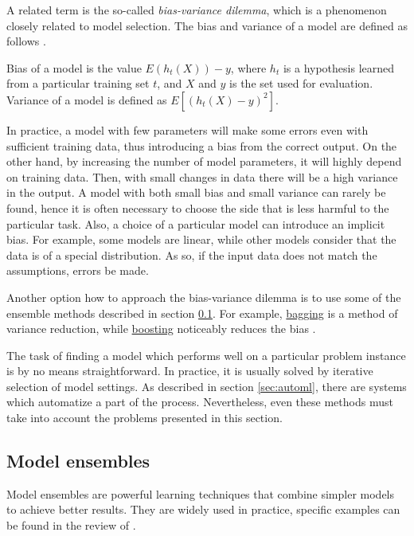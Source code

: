 A related term is the so-called \emph{bias-variance dilemma}, which is a phenomenon
closely related to model selection. The bias and variance of a model are
defined as follows \citep[p.59,~356]{CaseBerg:01}.

\begin{definition}
Bias of a model is the value $E(h_t(X)) - y$, where $h_t$ is a
hypothesis learned from a particular training set $t$, and $X$ and $y$ is the
set used for evaluation. Variance of a model is defined as $E[(h_t(X) - y)^2]$.
\end{definition}

In practice, a model with few parameters will make some errors even with
sufficient training data, thus introducing a bias from the correct output.
On the other hand, by  increasing the number of model parameters, it will
highly depend on training data. Then, with small changes in data there will be
a high variance in the output. A model with both small bias and small variance
can rarely be found, hence it is often necessary to choose the side that is
less harmful to the particular task. Also, a choice of a particular model can
introduce an implicit bias. For example, some models are linear, while other models
consider that the data is of a special distribution. As so, if the input data does
not match the assumptions, errors be made.

Another option how to approach the bias-variance dilemma
is to use some of the ensemble methods described in section \ref{ensemble}. For
example, \hyperref[bagging]{bagging} is a method of variance reduction, while
\hyperref[boosting]{boosting} noticeably reduces the bias
\citep[p.~93--94,~338]{Flach:2012:MLA:2490546}.

The task of finding a model which performs well on a particular problem
instance is by no means straightforward. In practice, it is usually solved by
iterative selection of model settings. As described in section \ref{sec:automl},
there are systems which automatize a part of the process. Nevertheless, even
these methods must take into account the problems presented in this section.

\subsection{Model ensembles} \label{ensemble}
Model ensembles are powerful learning techniques that combine simpler models 
to achieve better results. They are widely used in practice, specific examples
can be found in the review of \cite{Rokach:2009:TCE:1609202.1609436}.

